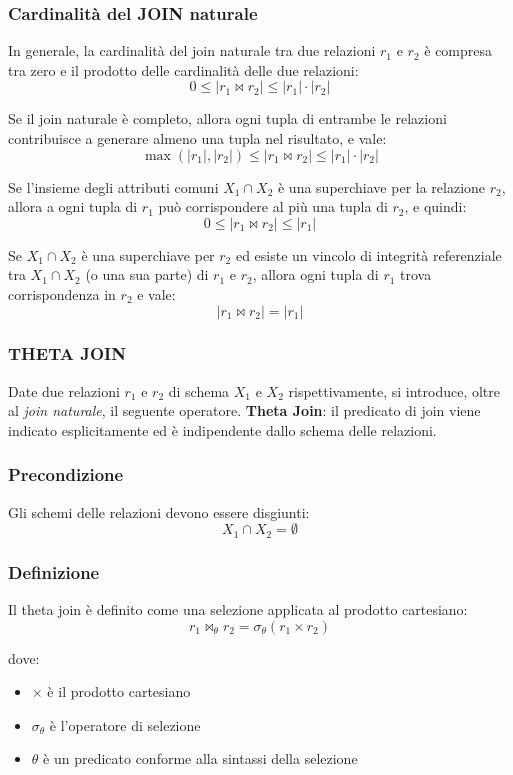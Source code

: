 \subsubsection{Cardinalità del JOIN naturale}
In generale, la cardinalità del join naturale tra due relazioni $r_1$ e $r_2$
è compresa tra zero e il prodotto delle cardinalità delle due relazioni:
\[
0 \le |r_1 \bowtie r_2| \le |r_1| \cdot |r_2|
\]

Se il join naturale è completo, allora ogni tupla di entrambe le relazioni
contribuisce a generare almeno una tupla nel risultato, e vale:
\[
\max(|r_1|, |r_2|) \le |r_1 \bowtie r_2| \le |r_1| \cdot |r_2|
\]

Se l’insieme degli attributi comuni $X_1 \cap X_2$ è una superchiave per
la relazione $r_2$, allora a ogni tupla di $r_1$ può corrispondere al più
una tupla di $r_2$, e quindi:
\[
0 \le |r_1 \bowtie r_2| \le |r_1|
\]

Se $X_1 \cap X_2$ è una superchiave per $r_2$ ed esiste un vincolo di
integrità referenziale tra $X_1 \cap X_2$ (o una sua parte) di $r_1$ e $r_2$,
allora ogni tupla di $r_1$ trova corrispondenza in $r_2$ e vale:
\[
|r_1 \bowtie r_2| = |r_1|
\]
\newpage
\subsubsection{THETA JOIN}
Date due relazioni \( r_1 \) e \( r_2 \) di schema \( X_1 \) e \( X_2 \) rispettivamente,
si introduce, oltre al \textit{join naturale}, il seguente operatore.
\textbf{Theta Join}: il predicato di join viene indicato esplicitamente
ed è indipendente dallo schema delle relazioni.

\subsubsection*{Precondizione}
Gli schemi delle relazioni devono essere disgiunti:
\[
X_1 \cap X_2 = \emptyset
\]


\subsubsection*{Definizione}
Il theta join è definito come una selezione applicata al prodotto cartesiano:
\[
r_1 \bowtie_\theta r_2 = \sigma_\theta ( r_1 \times r_2 )
\]

dove:
\begin{itemize}
	\item \( \times \) è il prodotto cartesiano
	\item \( \sigma_\theta \) è l’operatore di selezione
	\item \( \theta \) è un predicato conforme alla sintassi della selezione
\end{itemize}


